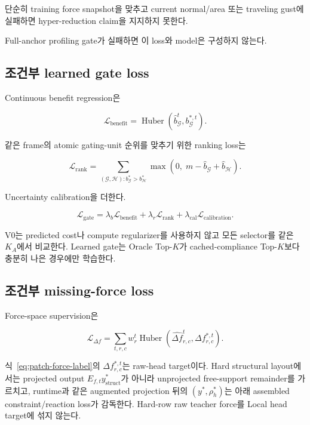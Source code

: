 \documentclass[11pt,a4paper]{article}
\begin{document}
단순히 training force snapshot을 맞추고
current normal/area 또는 traveling gust에 실패하면 hyper-reduction claim을 지지하지 못한다.

Full-anchor profiling gate가 실패하면 이 loss와 model은 구성하지 않는다.

\subsection{조건부 learned gate loss}

Continuous benefit regression은

\begin{equation}
  \mathcal L_{\mathrm{benefit}}
  =
  \operatorname{Huber}
  (\widehat b_{\mathcal G}^t,b_{\mathcal G}^{*,t}).
\end{equation}

같은 frame의 atomic gating-unit 순위를 맞추기 위한 ranking loss는

\begin{equation}
  \mathcal L_{\mathrm{rank}}
  =
  \sum_{(\mathcal G,\mathcal H):b_{\mathcal G}^*>b_{\mathcal H}^*}
  \max
  \left(
    0,\;
    m-\widehat b_{\mathcal G}+\widehat b_{\mathcal H}
  \right).
\end{equation}

Uncertainty calibration을 더한다.

\begin{equation}
  \mathcal L_{\mathrm{gate}}
  =
  \lambda_b\mathcal L_{\mathrm{benefit}}
  +\lambda_r\mathcal L_{\mathrm{rank}}
  +\lambda_{\mathrm{cal}}\mathcal L_{\mathrm{calibration}}.
\end{equation}

V0는 predicted cost나 compute regularizer를 사용하지 않고 모든 selector를 같은 \(K_A\)에서 비교한다.
Learned gate는 Oracle Top-\(K\)가 cached-compliance Top-\(K\)보다 충분히 나은 경우에만 학습한다.

\subsection{조건부 missing-force loss}

Force-space supervision은

\begin{equation}
  \mathcal L_{\Delta f}
  =
  \sum_{t,r,c}
  w_r^t
  \operatorname{Huber}
  \left(
    \widehat{\Delta f}_{r,c}^t,
    \Delta f_{r,c}^{*,t}
  \right).
\end{equation}

식~\eqref{eq:patch-force-label}의 \(\Delta f_{r,c}^{*,t}\)는 raw-head target이다.
Hard structural layout에서는 projected output \(E_{f,t}y_{\mathrm{struct}}^*\)가 아니라
unprojected free-support remainder를 가르치고, runtime과 같은 augmented projection 뒤의
\((y^*,\rho_h^*)\)는 아래 assembled constraint/reaction loss가 감독한다.
Hard-row raw teacher force를 Local head target에 섞지 않는다.
\end{document}
